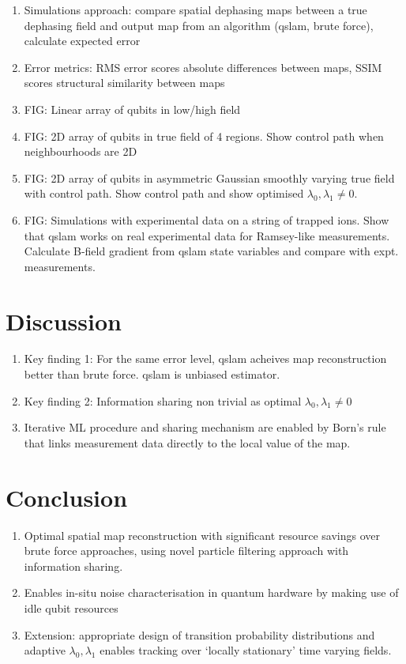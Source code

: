 \begin{enumerate}
	\item Simulations approach:  compare spatial dephasing maps between a true dephasing field and output map from an algorithm (qslam, brute force), calculate expected error
	\item Error metrics: RMS error scores absolute differences between maps, SSIM scores structural similarity between maps
	\item FIG: Linear array of qubits in low/high field 
	\item FIG: 2D array of qubits in true field of 4 regions. Show control path when neighbourhoods are 2D
	\item FIG: 2D array of qubits in asymmetric Gaussian smoothly varying true field with control path. Show control path and show optimised $\lambda_0, \lambda_1 \neq 0$.
	\item FIG: Simulations with experimental data on a string of trapped ions. Show that qslam works on real experimental data for Ramsey-like measurements.  Calculate B-field gradient from qslam state variables and compare with expt. measurements.
\end{enumerate} 

\section{Discussion}

\begin{enumerate}
	\item Key finding 1: For the same error level, qslam acheives map reconstruction better than brute force. qslam is unbiased estimator.
	\item Key finding 2: Information sharing non trivial as optimal $\lambda_0, \lambda_1 \neq 0$
	\item Iterative ML procedure and sharing mechanism are enabled by Born's rule that links measurement data directly to the local value of the map. 
\end{enumerate} 

\section{Conclusion}

\begin{enumerate}
	\item Optimal spatial map reconstruction with significant resource savings over brute force approaches, using novel particle filtering approach with information sharing. \item Enables in-situ noise characterisation in quantum hardware by making use of idle qubit resources
	\item  Extension: appropriate design of transition probability distributions and adaptive $\lambda_0, \lambda_1$ enables tracking over `locally stationary' time varying fields. 
\end{enumerate} 

